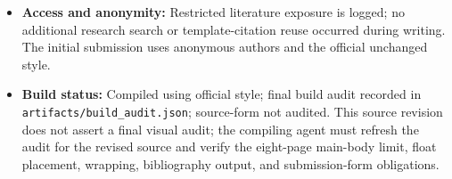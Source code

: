\documentclass{article}
\begin{document}
\begin{itemize}
 \item \textbf{Access and anonymity:} Restricted literature exposure is logged; no additional research search or template-citation reuse occurred during writing. The initial submission uses anonymous authors and the official unchanged style.
 \item \textbf{Build status:} Compiled using official style; final build audit recorded in \texttt{artifacts/build\_audit.json}; source-form not audited. This source revision does not assert a final visual audit; the compiling agent must refresh the audit for the revised source and verify the eight-page main-body limit, float placement, wrapping, bibliography output, and submission-form obligations.
\end{itemize}
\end{document}
